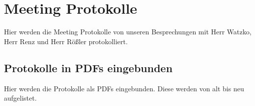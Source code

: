 \section{Meeting Protokolle}
Hier werden die Meeting Protokolle von unseren Besprechungen mit Herr Watzko, Herr Renz und Herr Rößler protokolliert.

\subsection{Protokolle in PDFs eingebunden}
Hier werden die Protokolle als PDFs eingebunden. Diese werden von alt bis neu aufgelistet.














